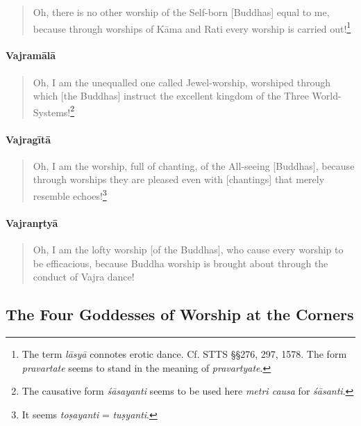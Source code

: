 \documentclass[11pt]{book}
\newcommand{\skt}[1]{\emph{#1}}
\begin{document}
\begin{verse}
Oh, there is no other worship of the Self-born [Buddhas] equal to me, because through worships of Kāma and Rati every worship is carried out!\footnote{The term \skt{lāsyā} connotes erotic dance. Cf. STTS §§276, 297, 1578. The form \skt{pravartate} seems to stand in the meaning of \skt{pravartyate}.}\\
\end{verse}

\paragraph{Vajramālā}

\begin{verse}
Oh, I am the unequalled one called Jewel-worship, worshiped through which [the Buddhas] instruct the excellent kingdom of the Three World-Systems!\footnote{The causative form \skt{śāsayanti} seems to be used here \skt{metri causa} for \skt{śāsanti}.}\\
\end{verse}

\paragraph{Vajragītā}

\begin{verse}
Oh, I am the worship, full of chanting, of the All-seeing [Buddhas], because through worships they are pleased even with [chantings] that merely resemble echoes!\footnote{It seems \skt{toṣayanti} = \skt{tuṣyanti}.}\\
\end{verse}

\paragraph{Vajranr̥tyā}

\begin{verse}
Oh, I am the lofty worship [of the Buddhas], who cause every worship to be efficacious, because Buddha worship is brought about through the conduct of Vajra dance!\\
\end{verse}

\subsection{The Four Goddesses of Worship at the Corners}
\end{document}
